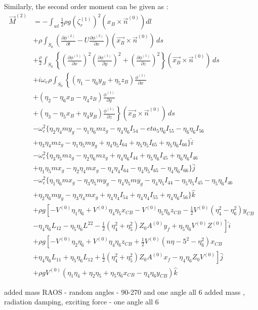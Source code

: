 Similarly, the second order moment can be given as :
\begin{align}
    \vec{M}^{(2)} &= -\int_{wl}\frac{1}{2}\rho g (\zeta_r^{(1)})^2 (x_B\times \vec{n}^{(0)}) dl \\ \nonumber
    &+\rho\int_{S_0}\left(\frac{\partial \phi^{(2)}}{\partial t} - U\frac{\partial \phi^{(2)}}{\partial x}\right)
    (\vec{x_B}\times\vec{n}^{(0)})\,ds \\ \nonumber
    &+\frac{\rho}{2}\int_{S_0}\left\{\left(\frac{\partial \phi^{(1)}}{\partial x}\right)^2
    \left(\frac{\partial \phi^{(1)}}{\partial y}\right)^2 + \left(\frac{\partial \phi^{(1)}}{\partial z}\right)^2
    \right\}(\vec{x_B}\times\vec{n}^{(0)})\,ds \\ \nonumber
    &+i\omega_e\rho\int_{S_0}
    \left\{(\eta_1-\eta_6y_B+\eta_5z_B)\frac{\phi^{(1)}}{\partial x} \right. \\ \nonumber 
    &\left. + (\eta_2-\eta_6x_B-\eta_4z_B)\frac{\phi^{(1)}}{\partial y}\right. \\ \nonumber
    &\left. + (\eta_3-\eta_5x_B+\eta_4y_B)\frac{\phi^{(1)}}{\partial z}\right\}
    (\vec{x_B}\times \vec{n}^{(0)})\,ds \\ \nonumber
    &-\omega_e^2\{\eta_2\eta_4my_g-\eta_1\eta_6mz_g-\eta_4\eta_6I_{54}
    -eta_5\eta_6I_{55}-\eta_6\eta_6I_{56} \\ \nonumber
    &+\eta_3\eta_4mz_g-\eta_1\eta_5my_g+\eta_4\eta_5I_{64}+\eta_5\eta_5 I_{65}
    +\eta_5\eta_6 I_{66} \}\hat{i} \\ \nonumber
    &-\omega_e^2\{\eta_3\eta_5mz_g-\eta_2\eta_6mz_g+\eta_4\eta_6I_{44}+\eta_5\eta_6 I_{45}
    +\eta_6\eta_6I_{46}\\ \nonumber
    &+\eta_1\eta_5mx_g-\eta_2\eta_4mx_g-\eta_4\eta_4 I_{64}-\eta_4\eta_5 I_{65}-\eta_4\eta_6 I_{66}\} \hat{j} \\ \nonumber
    &-\omega_e^2\{\eta_1\eta_6mx_g-\eta_3\eta_5my_g-\eta_4\eta_5my_g-\eta_4\eta_5 I_{44}
    -\eta_5\eta_5 I_{45}-\eta_5\eta_6 I_{46} \\ \nonumber
    &+\eta_2\eta_6my_g-\eta_3\eta_4mx_g+\eta_4\eta_4 I_{54}+\eta_4\eta_4 I_{55}
    +\eta_4\eta_6 I_{56} \}\hat{k} \\ \nonumber
    &+\rho g \left[-V^{(0)}\eta_1\eta_6+V^{(0)}\eta_4\eta_5x_{CB}-V^{(0)}\eta_5\eta_6z_{CB}
    -\frac{1}{2}V^{(0)}(\eta_4^2-\eta_6^2)y_{CB} \right. \\ \nonumber
    &\left.-\eta_4\eta_6L_{12} -\eta_5\eta_6L^{22}-\frac{1}{2}(\eta_4^2+\eta_5^2)
    Z_0A^{(0)}y_f+\eta_5\eta_6V^{(0)}Z^{(0)}\right]\hat{i} \\ \nonumber
    &+\rho g \left[-V^{(0)}\eta_2\eta_6+V^{(0)}\eta_4\eta_6 z_{CB}+\frac{1}{2}V^{(0)} 
    (n\eta-5^2-\eta_6^2)x_{CB} \right. \\ \nonumber
    &\left. +\eta_4\eta_6 L_{11}+\eta_5\eta_6L_{12}+\frac{1}{2}(\eta_4^2+\eta_5^2)Z_0A^{(0)}x_f
    -\eta_4\eta_6 Z_0V^{(0)}\right]\hat{j} \\ \nonumber
    &+\rho g V^{(0)}(\eta_1\eta_4+\eta_2\eta_5+\eta_5\eta_6x_{CB}-\eta_4\eta_6y_{CB})\hat{k}
\end{align}

added mass 
RAOS - random angles - 90-270 and one angle all 6
added mass , radiation damping, exciting force - one angle all 6
